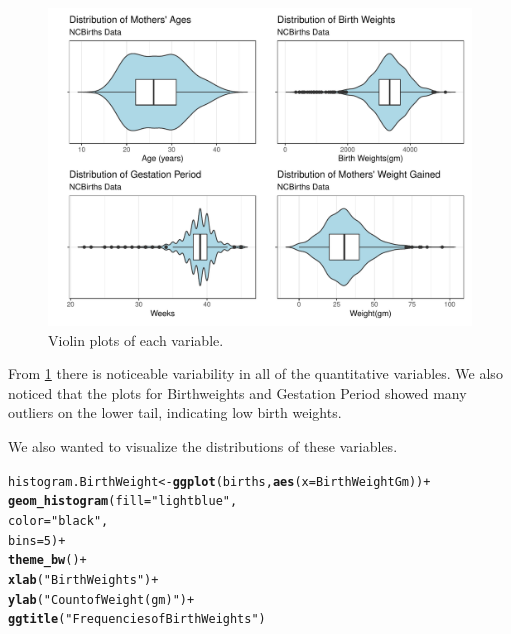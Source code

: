 \documentclass{article}\usepackage[]{graphicx}\usepackage[]{xcolor}
\makeatletter
\def\maxwidth{ %
  \ifdim\Gin@nat@width>\linewidth
    \linewidth
  \else
    \Gin@nat@width
  \fi
}
\newcommand{\hlnum}[1]{\textcolor[rgb]{0.686,0.059,0.569}{#1}}%
\newcommand{\hlstr}[1]{\textcolor[rgb]{0.192,0.494,0.8}{#1}}%
\newcommand{\hlopt}[1]{\textcolor[rgb]{0,0,0}{#1}}%
\newcommand{\hlstd}[1]{\textcolor[rgb]{0.345,0.345,0.345}{#1}}%
\newcommand{\hlkwb}[1]{\textcolor[rgb]{0.69,0.353,0.396}{#1}}%
\newcommand{\hlkwc}[1]{\textcolor[rgb]{0.333,0.667,0.333}{#1}}%
\newcommand{\hlkwd}[1]{\textcolor[rgb]{0.737,0.353,0.396}{\textbf{#1}}}%
\newenvironment{kframe}{%
 \def\at@end@of@kframe{}%
 \ifinner\ifhmode%
  \def\at@end@of@kframe{\end{minipage}}%
  \begin{minipage}{\columnwidth}%
 \fi\fi%
 \def\FrameCommand##1{\hskip\@totalleftmargin \hskip-\fboxsep
 \colorbox{shadecolor}{##1}\hskip-\fboxsep
     \hskip-\linewidth \hskip-\@totalleftmargin \hskip\columnwidth}%
 \MakeFramed {\advance\hsize-\width
   \@totalleftmargin\z@ \linewidth\hsize
   \@setminipage}}%
 {\par\unskip\endMakeFramed%
 \at@end@of@kframe}
\newenvironment{knitrout}{}{} %
\makeatother
\begin{document}
\begin{enumerate}[a.]
\begin{figure}[H]
\centering
\begin{knitrout}
\color{fgcolor}
\includegraphics[width=\maxwidth]{figure/unnamed-chunk-3-1} 
\end{knitrout}
\caption{Violin plots of each variable.}
\label{ViolinSummary}
\end{figure}

From \ref{ViolinSummary} there is noticeable variability in all of the quantitative variables. We also noticed that the plots for Birthweights and Gestation Period showed many outliers on the lower tail, indicating low birth weights. 

We also wanted to visualize the distributions of these variables.

\begin{knitrout}
\color{fgcolor}\begin{kframe}
\begin{alltt}
\hlstd{histogram.BirthWeight}\hlkwb{<-} \hlkwd{ggplot}\hlstd{(births,} \hlkwd{aes}\hlstd{(}\hlkwc{x}\hlstd{=BirthWeightGm))}\hlopt{+}
  \hlkwd{geom_histogram}\hlstd{(}\hlkwc{fill} \hlstd{=} \hlstr{"lightblue"}\hlstd{,}
                 \hlkwc{color} \hlstd{=} \hlstr{"black"}\hlstd{,}
                 \hlkwc{bins} \hlstd{=} \hlnum{5}\hlstd{)} \hlopt{+}
  \hlkwd{theme_bw}\hlstd{()} \hlopt{+}
  \hlkwd{xlab}\hlstd{(}\hlstr{"Birth Weights"}\hlstd{)}\hlopt{+}
  \hlkwd{ylab}\hlstd{(}\hlstr{"Count of Weight(gm)"}\hlstd{)}\hlopt{+}
  \hlkwd{ggtitle}\hlstd{(}\hlstr{"Frequencies of Birth Weights"}\hlstd{)}



\end{alltt}
\end{kframe}
\end{knitrout}
\end{enumerate}
\end{document}
